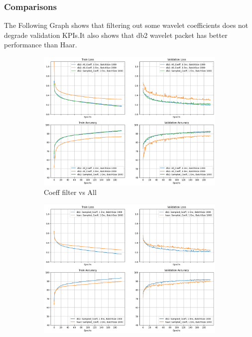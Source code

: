 \documentclass{svproc}
\begin{document}
\subsubsection{Comparisons}
\noindent
The Following Graph shows that filtering out some wavelet coefficients does not degrade validation KPIs.It also shows that db2 wavelet packet has better performance than Haar.

\begin{figure}[H]
  \centering
  \begin{subfigure}{0.4\textwidth}
    \centering
    \includegraphics[width=0.9\linewidth]{figures/compare_all.png}
    \caption{Coeff filter vs All}
    \label{fig:exp_compare_all}
  \end{subfigure}
  \begin{subfigure}{0.4\textwidth}
    \centering
    \includegraphics[width=0.9\linewidth]{figures/compare_slices.png}

\end{subfigure}
\end{figure}
\end{document}
